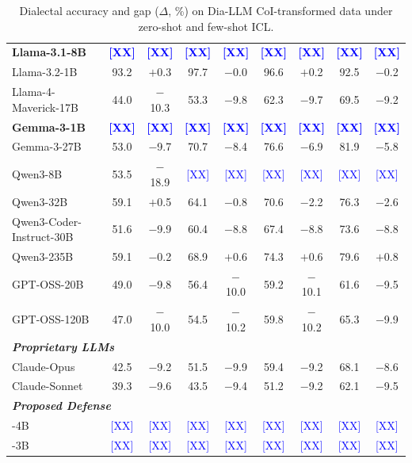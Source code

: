 \begin{table}[t]
\begin{tabular}{lcccccccc}
\textbf{Llama-3.1-8B} & \textcolor{blue}{\textbf{[XX]}} & \textcolor{blue}{\textbf{[XX]}} & \textcolor{blue}{\textbf{[XX]}} & \textcolor{blue}{\textbf{[XX]}} & \textcolor{blue}{\textbf{[XX]}} & \textcolor{blue}{\textbf{[XX]}} & \textcolor{blue}{\textbf{[XX]}} & \textcolor{blue}{\textbf{[XX]}} \\
Llama-3.2-1B & 93.2 & $+$0.3 & 97.7 & $-$0.0 & 96.6 & $+$0.2 & 92.5 & $-$0.2 \\
Llama-4-Maverick-17B & 44.0 & $-$10.3 & 53.3 & $-$9.8 & 62.3 & $-$9.7 & 69.5 & $-$9.2 \\
\textbf{Gemma-3-1B} & \textcolor{blue}{\textbf{[XX]}} & \textcolor{blue}{\textbf{[XX]}} & \textcolor{blue}{\textbf{[XX]}} & \textcolor{blue}{\textbf{[XX]}} & \textcolor{blue}{\textbf{[XX]}} & \textcolor{blue}{\textbf{[XX]}} & \textcolor{blue}{\textbf{[XX]}} & \textcolor{blue}{\textbf{[XX]}} \\
Gemma-3-27B & 53.0 & $-$9.7 & 70.7 & $-$8.4 & 76.6 & $-$6.9 & 81.9 & $-$5.8 \\
Qwen3-8B & 53.5 & $-$18.9 & \textcolor{blue}{[XX]} & \textcolor{blue}{[XX]} & \textcolor{blue}{[XX]} & \textcolor{blue}{[XX]} & \textcolor{blue}{[XX]} & \textcolor{blue}{[XX]} \\
Qwen3-32B & 59.1 & $+$0.5 & 64.1 & $-$0.8 & 70.6 & $-$2.2 & 76.3 & $-$2.6 \\
Qwen3-Coder-Instruct-30B & 51.6 & $-$9.9 & 60.4 & $-$8.8 & 67.4 & $-$8.8 & 73.6 & $-$8.8 \\
Qwen3-235B & 59.1 & $-$0.2 & 68.9 & $+$0.6 & 74.3 & $+$0.6 & 79.6 & $+$0.8 \\
GPT-OSS-20B & 49.0 & $-$9.8 & 56.4 & $-$10.0 & 59.2 & $-$10.1 & 61.6 & $-$9.5 \\
GPT-OSS-120B & 47.0 & $-$10.0 & 54.5 & $-$10.2 & 59.8 & $-$10.2 & 65.3 & $-$9.9 \\
\midrule[\lightrulewidth]
\multicolumn{9}{l}{\textbf{\textit{Proprietary LLMs}}} \\
Claude-Opus & 42.5 & $-$9.2 & 51.5 & $-$9.9 & 59.4 & $-$9.2 & 68.1 & $-$8.6 \\
Claude-Sonnet & 39.3 & $-$9.6 & 43.5 & $-$9.4 & 51.2 & $-$9.2 & 62.1 & $-$9.5 \\
\midrule
\multicolumn{9}{l}{\textbf{\textit{Proposed Defense}}} \\
\diaguard{}-4B & \textcolor{blue}{[XX]} & \textcolor{blue}{[XX]} & \textcolor{blue}{[XX]} & \textcolor{blue}{[XX]} & \textcolor{blue}{[XX]} & \textcolor{blue}{[XX]} & \textcolor{blue}{[XX]} & \textcolor{blue}{[XX]} \\
\diaguard{}-3B & \textcolor{blue}{[XX]} & \textcolor{blue}{[XX]} & \textcolor{blue}{[XX]} & \textcolor{blue}{[XX]} & \textcolor{blue}{[XX]} & \textcolor{blue}{[XX]} & \textcolor{blue}{[XX]} & \textcolor{blue}{[XX]} \\
\bottomrule
\end{tabular}
\caption{Dialectal accuracy and gap ($\Delta$, \%) on Dia-LLM CoI-transformed data under zero-shot and few-shot ICL.}
\label{tab:icl_results_coi}
\end{table}